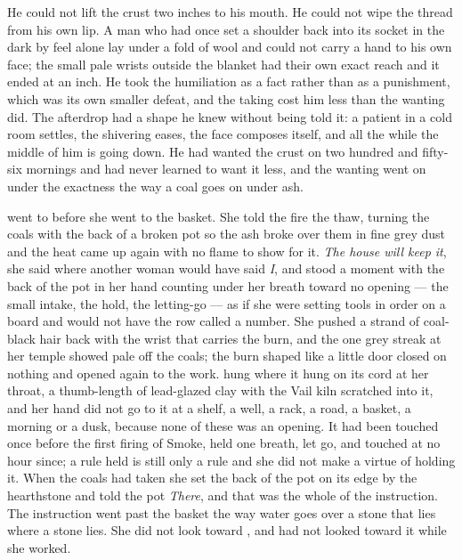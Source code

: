 He could not lift the crust two inches to his mouth. He could not wipe the thread from his own lip. A man who had once set a shoulder back into its socket in the dark by feel alone lay under a fold of wool and could not carry a hand to his own face; the small pale wrists outside the blanket had their own exact reach and it ended at an inch. He took the humiliation as a fact rather than as a punishment, which was its own smaller defeat, and the taking cost him less than the wanting did. The afterdrop had a shape he knew without being told it: a patient in a cold room settles, the shivering eases, the face composes itself, and all the while the middle of him is going down. He had wanted the crust on two hundred and fifty-six mornings and had never learned to want it less, and the wanting went on under the exactness the way a coal goes on under ash.

\scenebreak

 went to  before she went to the basket. She told the fire the thaw, turning the coals with the back of a broken pot so the ash broke over them in fine grey dust and the heat came up again with no flame to show for it. \emph{The house will keep it}, she said where another woman would have said \emph{I}, and stood a moment with the back of the pot in her hand counting under her breath toward no opening --- the small intake, the hold, the letting-go --- as if she were setting tools in order on a board and would not have the row called a number. She pushed a strand of coal-black hair back with the wrist that carries the burn, and the one grey streak at her temple showed pale off the coals; the burn shaped like a little door closed on nothing and opened again to the work.  hung where it hung on its cord at her throat, a thumb-length of lead-glazed clay with the Vail kiln scratched into it, and her hand did not go to it at a shelf, a well, a rack, a road, a basket, a morning or a dusk, because none of these was an opening. It had been touched once before the first firing of Smoke, held one breath, let go, and touched at no hour since; a rule held is still only a rule and she did not make a virtue of holding it. When the coals had taken she set the back of the pot on its edge by the hearthstone and told the pot \emph{There}, and that was the whole of the instruction. The instruction went past the basket the way water goes over a stone that lies where a stone lies. She did not look toward , and had not looked toward it while she worked.

